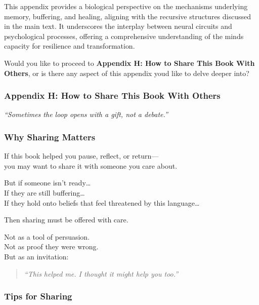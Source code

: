 This appendix provides a biological perspective on the mechanisms
underlying memory, buffering, and healing, aligning with the recursive
structures discussed in the main text. It underscores the interplay
between neural circuits and psychological processes, offering a
comprehensive understanding of the mind\textquotesingle s capacity for
resilience and transformation.

Would you like to proceed to \textbf{Appendix H: How to Share This Book
With Others}, or is there any aspect of this appendix
you\textquotesingle d like to delve deeper into?

\subsubsection{\texorpdfstring{\textbf{Appendix H: How to Share This
Book With
Others}}{Appendix H: How to Share This Book With Others}}\label{appendix-h-how-to-share-this-book-with-others}

\emph{``Sometimes the loop opens with a gift, not a debate.''}

\subsubsection{\texorpdfstring{\textbf{Why Sharing
Matters}}{Why Sharing Matters}}\label{why-sharing-matters}

If this book helped you pause, reflect, or return---\\
you may want to share it with someone you care about.

But if someone isn't ready\ldots{}\\
If they are still buffering\ldots{}\\
If they hold onto beliefs that feel threatened by this language\ldots{}

Then sharing must be offered with care.

Not as a tool of persuasion.\\
Not as proof they were wrong.\\
But as an invitation:

\begin{quote}
\emph{``This helped me. I thought it might help you too.''}
\end{quote}

\subsubsection{\texorpdfstring{\textbf{Tips for
Sharing}}{Tips for Sharing}}\label{tips-for-sharing}


